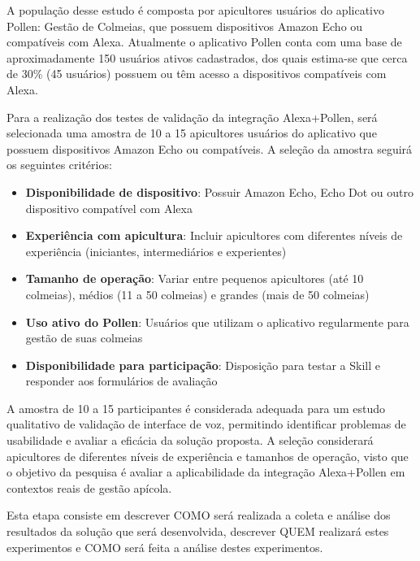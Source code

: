 \label{sec:esboco-projeto-pratica}

A população desse estudo é composta por apicultores usuários do aplicativo Pollen: Gestão de Colmeias, que possuem dispositivos Amazon Echo ou compatíveis com Alexa. 
Atualmente o aplicativo Pollen conta com uma base de aproximadamente 150 usuários ativos cadastrados, dos quais estima-se que cerca de 30\% (45 usuários) possuem ou têm acesso a dispositivos compatíveis com Alexa.

Para a realização dos testes de validação da integração Alexa+Pollen, será selecionada uma amostra de 10 a 15 apicultores usuários do aplicativo que possuem dispositivos Amazon Echo ou compatíveis. A seleção da amostra seguirá os seguintes critérios:

\begin{itemize}
    \item \textbf{Disponibilidade de dispositivo}: Possuir Amazon Echo, Echo Dot ou outro dispositivo compatível com Alexa
    \item \textbf{Experiência com apicultura}: Incluir apicultores com diferentes níveis de experiência (iniciantes, intermediários e experientes)
    \item \textbf{Tamanho de operação}: Variar entre pequenos apicultores (até 10 colmeias), médios (11 a 50 colmeias) e grandes (mais de 50 colmeias)
    \item \textbf{Uso ativo do Pollen}: Usuários que utilizam o aplicativo regularmente para gestão de suas colmeias
    \item \textbf{Disponibilidade para participação}: Disposição para testar a Skill e responder aos formulários de avaliação
\end{itemize}

A amostra de 10 a 15 participantes é considerada adequada para um estudo qualitativo de validação de interface de voz, permitindo identificar problemas de usabilidade e avaliar a eficácia da solução proposta. A seleção considerará apicultores de diferentes níveis de experiência e tamanhos de operação, visto que o objetivo da pesquisa é avaliar a aplicabilidade da integração Alexa+Pollen em contextos reais de gestão apícola.

\label{sec:coleta-analise-resultados}

Esta etapa consiste em descrever COMO será realizada a coleta e análise dos resultados da solução que será desenvolvida, descrever QUEM realizará estes experimentos e COMO será feita a análise destes experimentos.

